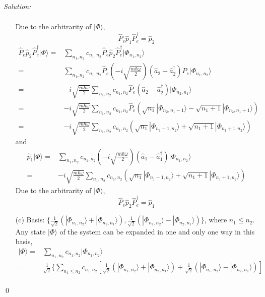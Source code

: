 \documentclass[12pt,a4paper]{article}
\newenvironment{sol}
    {\emph{Solution:}
    }
    {
    \qed
    }
\begin{document}
\begin{sol}
\begin{itemize}
\begin{align}
\end{align}
Due to the arbitrarity of $|\Phi\rangle$,
\begin{equation}
\hat{P}_e\hat{p}_1\hat{P}_e^{\dagger}=\hat{p}_2
\end{equation}
\begin{align}
\nonumber\hat{P}_e\hat{p}_2\hat{P}_e^{\dagger}|\Phi\rangle=&\sum_{n_1,n_2}c_{n_1,n_2}\hat{P}_e\hat{p}_2\hat{P}_e^{\dagger}|\Phi_{n_1,n_2}\rangle\\
\nonumber=&\sum_{n_1,n_2}c_{n_1,n_2}\hat{P}_e(-i\sqrt{\frac{m\hbar\omega}{2}})(\hat{a}_2-\hat{a}_2^{\dagger})\hat{P}_e|\Phi_{n_1,n_2}\rangle\\
\nonumber=&-i\sqrt{\frac{m\hbar\omega}{2}}\sum_{n_1,n_2}c_{n_1,n_2}\hat{P}_e(\hat{a}_2-\hat{a}_2^{\dagger})|\Phi_{n_2,n_1}\rangle\\
\nonumber=&-i\sqrt{\frac{m\hbar\omega}{2}}\sum_{n_1,n_2}c_{n_1,n_2}\hat{P}_e(\sqrt{n_1}|\Phi_{n_2,n_1-1}\rangle-\sqrt{n_1+1}|\Phi_{n_2,n_1+1}\rangle)\\
=&-i\sqrt{\frac{m\hbar\omega}{2}}\sum_{n_1,n_2}c_{n_1,n_2}(\sqrt{n_1}|\Phi_{n_1-1,n_2}\rangle+\sqrt{n_1+1}|\Phi_{n_1+1,n_2}\rangle)
\end{align}
and
\begin{align}
\nonumber\hat{p}_1|\Phi\rangle=&\sum_{n_1,n_2}c_{n_1,n_2}(-i\sqrt{\frac{m\hbar\omega}{2}})(\hat{a}_1-\hat{a}_1^{\dagger})|\Phi_{n_1,n_2}\rangle\\
=&-i\sqrt{\frac{m\hbar\omega}{2}}\sum_{n_1,n_2}c_{n_1,n_2}(\sqrt{n_1}|\Phi_{n_1-1,n_2}\rangle+\sqrt{n_1+1}|\Phi_{n_1+1,n_2}\rangle)
\end{align}
Due to the arbitrarity of $|\Phi\rangle$,
\begin{equation}
\hat{P}_e\hat{p}_2\hat{P}_e^{\dagger}=\hat{p}_1
\end{equation}
\item[(c)] Basis: $\{\frac{1}{\sqrt{2}}(|\Phi_{n_1,n_2}\rangle+|\Phi_{n_2,n_1}\rangle),\frac{1}{\sqrt{2}}(|\Phi_{n_1,n_2}\rangle-|\Phi_{n_2,n_1}\rangle)\}$, where $n_1\leq n_2$.\\
Any state $|\Phi\rangle$ of the system can be expanded in one and only one way in this basis,
\begin{align}
\nonumber|\Phi\rangle=&\sum_{n_1,n_2}c_{n_1,n_2}|\Phi_{n_1,n_2}\rangle\\
=&\frac{1}{\sqrt{2}}\{\sum_{n_1\leq n_2}c_{n_1,n_2}[\frac{1}{\sqrt{2}}(|\Phi_{n_1,n_2}\rangle+|\Phi_{n_2,n_1}\rangle)+\frac{1}{\sqrt{2}}(|\Phi_{n_1,n_2}\rangle-|\Phi_{n_2,n_1}\rangle)]\\

\end{align}
\end{itemize}
\end{sol}
\end{document}
